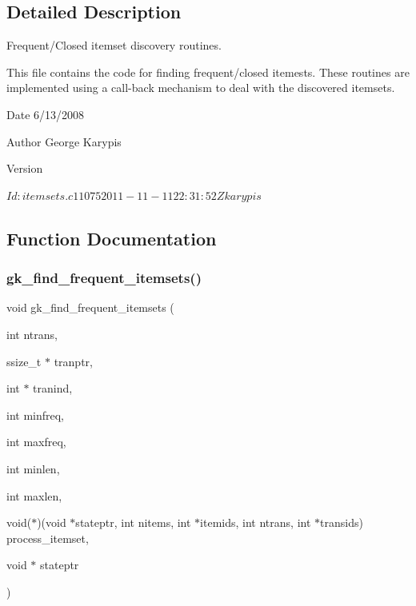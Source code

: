 \subsection{Detailed Description}
Frequent/\+Closed itemset discovery routines. 

This file contains the code for finding frequent/closed itemests. These routines are implemented using a call-\/back mechanism to deal with the discovered itemsets.

\begin{DoxyDate}{Date}
6/13/2008 
\end{DoxyDate}
\begin{DoxyAuthor}{Author}
George Karypis 
\end{DoxyAuthor}
\begin{DoxyVersion}{Version}
\begin{DoxyVerb}$Id: itemsets.c 11075 2011-11-11 22:31:52Z karypis $ \end{DoxyVerb}
 
\end{DoxyVersion}


\subsection{Function Documentation}
\mbox{\label{a00104_abc9e8f6a3efe2f0f3ec79b5d8883b246}} 
\subsubsection{\texorpdfstring{gk\+\_\+find\+\_\+frequent\+\_\+itemsets()}{gk\_find\_frequent\_itemsets()}}
{\footnotesize\ttfamily void gk\+\_\+find\+\_\+frequent\+\_\+itemsets (\begin{DoxyParamCaption}\item[{int}]{ntrans,  }\item[{ssize\+\_\+t $\ast$}]{tranptr,  }\item[{int $\ast$}]{tranind,  }\item[{int}]{minfreq,  }\item[{int}]{maxfreq,  }\item[{int}]{minlen,  }\item[{int}]{maxlen,  }\item[{void($\ast$)(void $\ast$stateptr, int nitems, int $\ast$itemids, int ntrans, int $\ast$transids)}]{process\+\_\+itemset,  }\item[{void $\ast$}]{stateptr }\end{DoxyParamCaption})}

